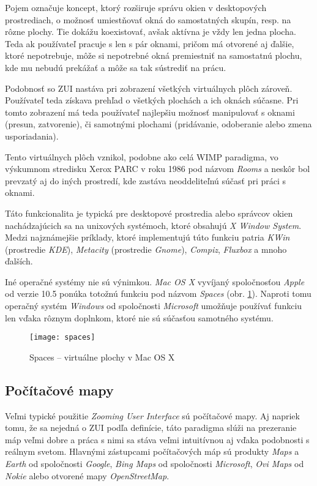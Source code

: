 Pojem  označuje koncept, ktorý rozširuje správu okien v desktopových prostrediach, o možnosť umiestňovať okná do samostatných skupín, resp. na rôzne plochy. Tie dokážu koexistovať, avšak aktívna je vždy len jedna plocha. Teda ak používateľ pracuje s len s pár oknami, pričom má otvorené aj ďalšie, ktoré nepotrebuje, môže si nepotrebné okná premiestniť na samostatnú plochu, kde mu nebudú prekážať a môže sa tak sústrediť na prácu.

Podobnosť so ZUI nastáva pri zobrazení všetkých virtuálnych plôch zároveň. Používateľ teda získava prehľad o všetkých plochách a ich oknách súčasne. Pri tomto zobrazení má teda používateľ najlepšiu možnosť manipulovať s oknami (presun, zatvorenie), či samotnými plochami (pridávanie, odoberanie alebo zmena usporiadania).

Tento virtuálnych plôch vznikol, podobne ako celá WIMP paradigma, vo výskumnom stredisku Xerox PARC v roku 1986 pod názvom \textit{Rooms} \cite{rooms} a neskôr bol prevzatý aj do iných prostredí, kde zastáva neoddeliteľnú súčasť pri práci s oknami.

Táto funkcionalita je typická pre desktopové prostredia alebo správcov okien nachádzajúcich sa na unixových systémoch, ktoré obsahujú \textit{X Window System}. Medzi najznámejšie príklady, ktoré implementujú túto funkciu patria \textit{KWin} (prostredie \textit{KDE}), \textit{Metacity} (prostredie \textit{Gnome}), \textit{Compiz}, \textit{Fluxbox} a mnoho ďalších.

Iné operačné systémy nie sú výnimkou. \textit{Mac OS X} vyvíjaný spoločnosťou \textit{Apple} od verzie 10.5 ponúka totožnú funkciu pod názvom \textit{Spaces} (obr. \ref{fig:spaces}). Naproti tomu operačný systém \textit{Windows} od spoločnosti \textit{Microsoft} umožňuje používať funkciu len vďaka rôznym doplnkom, ktoré nie sú súčasťou samotného systému.

\begin{figure}
 \texttt{[image: spaces]}
 \caption{Spaces -- virtuálne plochy v Mac OS X\label{fig:spaces}}
\end{figure}

\subsection{Počítačové mapy}

Veľmi typické použitie \textit{Zooming User Interface} sú počítačové mapy. Aj napriek tomu, že sa nejedná o ZUI podľa definície, táto paradigma slúži na prezeranie máp veľmi dobre a práca s nimi sa stáva veľmi intuitívnou aj vďaka podobnosti s reálnym svetom. Hlavnými zástupcami počítačových máp sú produkty \textit{Maps} a \textit{Earth} od spoločnosti \textit{Google}, \textit{Bing Maps} od spoločnosti \textit{Microsoft}, \textit{Ovi Maps} od \textit{Nokie} alebo otvorené mapy \textit{OpenStreetMap}.


